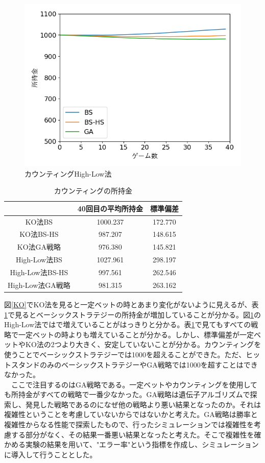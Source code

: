\begin{figure}[H]
 \begin{center} 
  \includegraphics[width=0.7\linewidth]{./figure/Hi-Lo}
  \caption{カウンティングHigh-Low法\label{Hi-Lo}}
 \end{center}
\end{figure}

\begin{table}[H]
 \caption{カウンティングの所持金\label{countting}}
 \begin{center}
  \begin{tabular}{|c|c|c|}
  \hline  & 40回目の平均所持金 & 標準偏差 \\
  \hline KO法BS & 1000.237 & 172.770\\
  \hline KO法BS-HS & 987.207 & 148.615 \\
  \hline KO法GA戦略 & 976.380 & 145.821\\
  \hline High-Low法BS & 1027.961 & 298.197\\
  \hline High-Low法BS-HS  & 997.561 & 262.546\\
  \hline High-Low法GA戦略 & 981.315 & 263.162\\
  \hline
  \end{tabular}
 \end{center}
\end{table}

図\ref{KO}でKO法を見ると一定ベットの時とあまり変化がないように見えるが、表\ref{countting}で見るとベーシックストラテジーの所持金が増加していることが分かる。図\ref{Hi-Lo}のHigh-Low法ではで増えていることがはっきりと分かる。表\ref{countting}で見てもすべての戦略で一定ベットの時よりも増えていることが分かる。しかし、標準偏差が一定ベットやKO法の2つより大きく、安定していないことが分かる。カウンティングを使うことでベーシックストラテジーでは1000を超えることができた。ただ、ヒットスタンドのみのベーシックストラテジーやGA戦略では1000を超すことはできなかった。\\
　ここで注目するのはGA戦略である。一定ベットやカウンティングを使用しても所持金がすべての戦略で一番少なかった。GA戦略は遺伝子アルゴリズムで探索し、発見した戦略であるのになぜ他の戦略より悪い結果となったのか。それは複雑性ということを考慮していないからではないかと考えた。GA戦略は勝率と複雑性からなる性能で探索したもので、行ったシミュレーションでは複雑性を考慮する部分がなく、その結果一番悪い結果となったと考えた。そこで複雑性を確かめる実験の結果を用いて、"エラー率"という指標を作成し、シミュレーションに導入して行うこととした。

